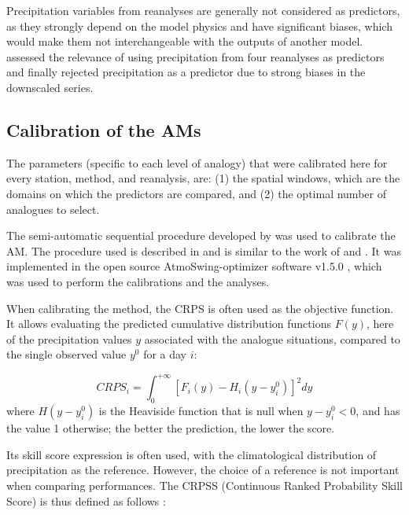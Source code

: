 \documentclass[smallextended]{svjour3}       %
\begin{document}
	Precipitation variables from reanalyses are generally not considered as predictors, as they strongly depend on the model physics \citep{Rienecker2011} and have significant biases, which would make them not interchangeable with the outputs of another model. \citet{Dayon2015} assessed the relevance of using precipitation from four reanalyses as predictors and finally rejected precipitation as a predictor due to strong biases in the downscaled series.
	
	
	\subsection{Calibration of the AMs}
	\label{sec:calibration}
	
	The parameters (specific to each level of analogy) that were calibrated here for every station, method, and reanalysis, are: (1) the spatial windows, which are the domains on which the predictors are compared, and (2) the optimal number of analogues to select.
	
	The semi-automatic sequential procedure developed by \citet{Bontron2004} was used to calibrate the AM. The procedure used is described in \citet{Horton2017c} and is similar to the work of \citet{Radanovics2013} and \citet{BenDaoud2016}. It was implemented in the open source AtmoSwing-optimizer software v1.5.0 \citep[www.atmoswing.org,][]{Horton2017a}, which was used to perform the calibrations and the analyses.
	
	When calibrating the method, the CRPS \citep[Continuous Ranked Probability Score,][]{Brown1974, Matheson1976, Hersbach2000} is often used as the objective function. It allows evaluating the predicted cumulative distribution functions $F(y)$, here of the precipitation values $y$ associated with the analogue situations, compared to the single observed value $y^{0}$ for a day $i$:
	
	\begin{equation}
	\label{eq:CRPS}
	CRPS_{i} = \int_{0}^{+\infty} \left[ F_{i}(y)-H_{i}(y-y_{i}^{0})\right]^{2} dy
	\end{equation}
	where $H(y-y_{i}^{0})$ is the Heaviside function that is null when $y-y_{i}^{0}<0$, and has the value 1 otherwise; the better the prediction, the lower the score.
	
	Its skill score expression is often used, with the climatological distribution of precipitation as the reference. However, the choice of a reference is not important when comparing performances. The CRPSS (Continuous Ranked Probability Skill Score) is thus defined as follows \citep{Bradley2011}:
	
\end{document}
